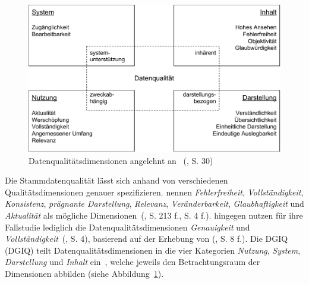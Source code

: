 \documentclass[
  language=german, %
  type=bachelor,%
  ngerman
]{isthesis}
\begin{document}
\begin{content}
  \begin{figure}
    \includegraphics[scale=0.60]{content/figures/15-dimensions}
    \caption[Datenqualitätsdimensionen]{Datenqualitätsdimensionen angelehnt an~\textsc{\citeauthor{rohweder2015informationsqualitat}} (\citeyear{rohweder2015informationsqualitat}, S. 30)}\label{15-dimensions}
  \end{figure}

	Die Stammdatenqualität lässt sich anhand von verschiedenen
	Qualitätsdimensionen genauer spezifizieren.
	\textsc{\citeauthor{pipino2002data}} nennen \zB{} \textit{Fehlerfreiheit},
	\textit{Vollständigkeit}, \textit{Konsistenz}, \textit{prägnante
	Darstellung}, \textit{Relevanz}, \textit{Veränderbarkeit},
	\textit{Glaubhaftigkeit} und \textit{Aktualität} als mögliche
	Dimensionen~(\citeyear{pipino2002data, legner2007stammdaten}, S. 213 f., S. 4
	f.). \textsc{\citeauthor{baghi2013controlling}} hingegen nutzen für ihre
	Fallstudie lediglich die Datenqualitätsdimensionen \textit{Genauigkeit} und
	\textit{Vollständigkeit}~(\citeyear{baghi2013controlling}, S. 4), basierend
	auf der Erhebung von
	\textsc{\citeauthor{wand1996anchoring}} (\citeyear{wand1996anchoring}, S. 8
	f.). Die \acrlong{DGIQ} (\acrshort{DGIQ}) teilt Datenqualitätsdimensionen in
	die vier Kategorien \textit{Nutzung}, \textit{System}, \textit{Darstellung}
	und \textit{Inhalt} ein~\cite[][S. 29 ff.]{rohweder2015informationsqualitat},
	welche jeweils den Betrachtungsraum der Dimensionen abbilden (siehe
	Abbildung~\ref{15-dimensions}).


\end{content}
\end{document}

